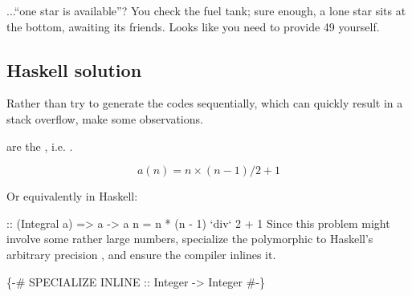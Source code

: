 ...``one star is available''? You check the fuel tank; sure enough, a lone star
sits at the bottom, awaiting its friends. Looks like you need to provide 49
yourself.
\nwenddocs{}\subsection{Haskell solution}

Rather than try to generate the codes sequentially, which can quickly result in
a stack overflow, make some observations.

 are the
, i.e. .

\begin{equation}
  a(n) = n \times (n - 1) / 2 + 1
\end{equation}

Or equivalently in Haskell:

\nwenddocs{}\endmoddef\nwstartdeflinemarkup{}\nwenddeflinemarkup
{} :: (Integral a) => a -> a
 n = n * (n - 1) `div` 2 + 1
\eatline
{}\nwendcode{}\nwdocspar
Since this problem might involve some rather large numbers, specialize the
polymorphic {\Tt{}\nwendquote} to Haskell's arbitrary precision , and
ensure the compiler inlines it.

\nwenddocs{}\plusendmoddef\nwstartdeflinemarkup{}\nwenddeflinemarkup
\{-# SPECIALIZE INLINE  :: Integer -> Integer #-\}
\nwendcode{}\nwdocspar

